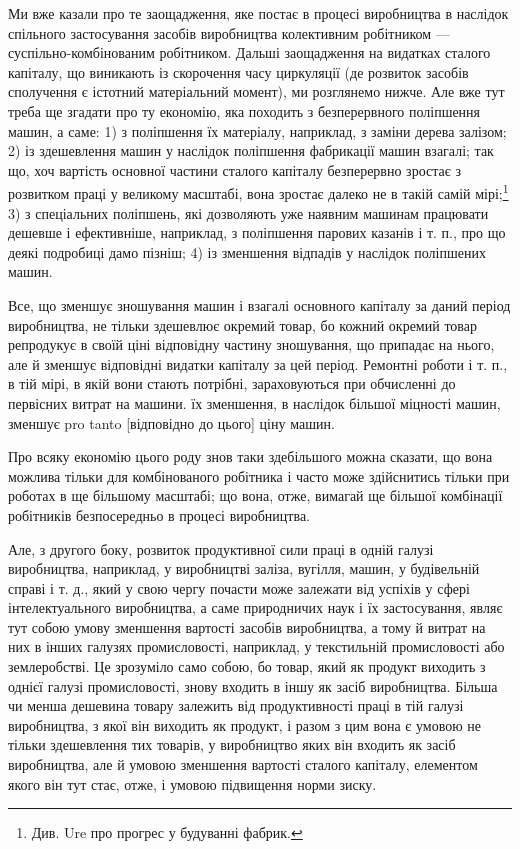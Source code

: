 Ми вже казали про те заощадження, яке постає в процесі
виробництва в наслідок спільного застосування засобів виробництва
колективним робітником — суспільно-комбінованим робітником.
Дальші заощадження на видатках сталого капіталу, що
виникають із скорочення часу циркуляції (де розвиток засобів
сполучення є істотний матеріальний момент), ми розглянемо
нижче. Але вже тут треба ще згадати про ту економію, яка
походить з безперервного поліпшення машин, а саме: 1) з поліпшення
їх матеріалу, наприклад, з заміни дерева залізом; 2) із
здешевлення машин у наслідок поліпшення фабрикації машин
взагалі; так що, хоч вартість основної частини сталого капіталу
безперервно зростає з розвитком праці у великому масштабі,
вона зростає далеко не в такій самій мірі;\footnote{
Див. Ure про прогрес у будуванні фабрик.
} 3) з спеціальних поліпшень,
які дозволяють уже наявним машинам працювати дешевше
і ефективніше, наприклад, з поліпшення парових казанів
і т. п., про що деякі подробиці дамо пізніш; 4) із зменшення
відпадів у наслідок поліпшених машин.

Все, що зменшує зношування машин і взагалі основного капіталу
за даний період виробництва, не тільки здешевлює окремий
товар, бо кожний окремий товар репродукує в своїй ціні
відповідну частину зношування, що припадає на нього, але
й зменшує відповідні видатки капіталу за цей період. Ремонтні
роботи і т. п., в тій мірі, в якій вони стають потрібні, зараховуються
при обчисленні до первісних витрат на машини. їх зменшення,
в наслідок більшої міцності машин, зменшує pro tanto
[відповідно до цього] ціну машин.

Про всяку економію цього роду знов таки здебільшого можна
сказати, що вона можлива тільки для комбінованого робітника
і часто може здійснитись тільки при роботах в ще більшому
масштабі; що вона, отже, вимагай ще більшої комбінації робітників
безпосередньо в процесі виробництва.

Але, з другого боку, розвиток продуктивної сили праці
в одній галузі виробництва, наприклад, у виробництві заліза,
вугілля, машин, у будівельній справі і т. д., який у свою чергу
почасти може залежати від успіхів у сфері інтелектуального
виробництва, а саме природничих наук і їх застосування, являє
тут собою умову зменшення вартості засобів виробництва, а тому
й витрат на них в інших галузях промисловості, наприклад,
у текстильній промисловості або землеробстві. Це зрозуміло
само собою, бо товар, який як продукт виходить з однієї галузі
промисловості, знову входить в іншу як засіб виробництва.
Більша чи менша дешевина товару залежить від продуктивності
праці в тій галузі виробництва, з якої він виходить як продукт,
і разом з цим вона є умовою не тільки здешевлення тих товарів,
у виробництво яких він входить як засіб виробництва, але
й умовою зменшення вартості сталого капіталу, елементом якого
він тут стає, отже, і умовою підвищення норми зиску.

